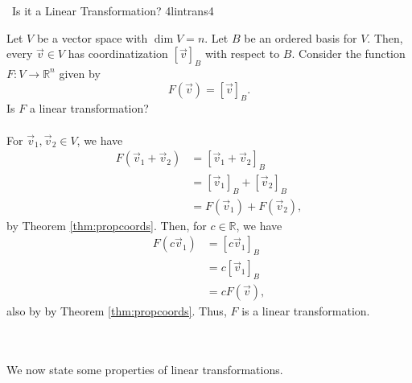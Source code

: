         \begin{example}{\Difficulty\,\Difficulty\,\,Is it a Linear Transformation? 4}{lintrans4}

            Let \(V\) be a vector space with \(\dim V=n\). Let \(B\) be an ordered basis for \(V\). Then, every \(\vec{v}\in V\) has coordinatization \([\vec{v}]_B\) with respect to \(B\). Consider the function \(F:V\to\mathbb{R}^n\) given by 
            \begin{equation*}
                F(\vec{v})=[\vec{v}]_B.
            \end{equation*}
            Is \(F\) a linear transformation?
            \\
            \\
            For \(\vec{v}_1,\vec{v}_2\in V\), we have
            \begin{align*}
                F(\vec{v}_1+\vec{v}_2)&=[\vec{v}_1+\vec{v}_2]_B \\
                &=[\vec{v}_1]_B+[\vec{v}_2]_B \\
                &=F(\vec{v}_1)+F(\vec{v}_2),
            \end{align*}
            by Theorem \ref{thm:propcoords}. Then, for \(c\in\mathbb{R}\), we have
            \begin{align*}
                F(c\vec{v}_1)&=[c\vec{v}_1]_B \\
                &=c[\vec{v}_1]_B \\
                &=cF(\vec{v}),
            \end{align*}
            also by by Theorem \ref{thm:propcoords}. Thus, \(F\) is a linear transformation.

        \end{example}
        \pagebreak
        \vphantom
        \\
        \\
        We now state some properties of linear transformations.
